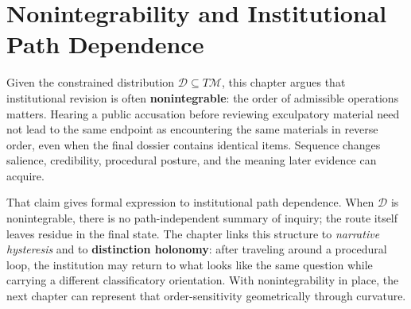 
\chapter{Nonintegrability and Institutional Path Dependence}
\label{ch:ch078}

Given the constrained distribution \(\mathcal D\subseteq T\mathcal M\), this chapter argues that institutional revision is often \textbf{nonintegrable}: the order of admissible operations matters. Hearing a public accusation before reviewing exculpatory material need not lead to the same endpoint as encountering the same materials in reverse order, even when the final dossier contains identical items. Sequence changes salience, credibility, procedural posture, and the meaning later evidence can acquire.

That claim gives formal expression to institutional path dependence. When \(\mathcal D\) is nonintegrable, there is no path-independent summary of inquiry; the route itself leaves residue in the final state. The chapter links this structure to \emph{narrative hysteresis} and to \textbf{distinction holonomy}: after traveling around a procedural loop, the institution may return to what looks like the same question while carrying a different classificatory orientation. With nonintegrability in place, the next chapter can represent that order-sensitivity geometrically through curvature.
